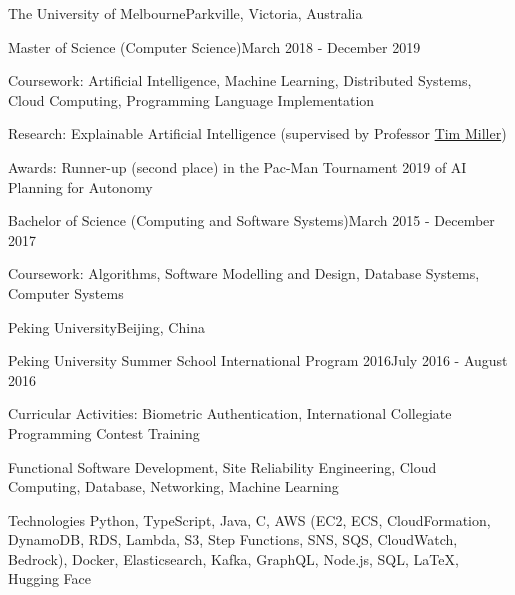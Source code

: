\documentclass{cv}
\begin{document}
\begin{cvlist}

\begin{cvheading}{The University of Melbourne}{Parkville, Victoria, Australia}
\begin{cvsubheading}{Master of Science (Computer Science)}{March 2018 - December 2019}
    \item Coursework: Artificial Intelligence, Machine Learning, Distributed Systems, Cloud Computing, Programming Language Implementation
    \item Research: Explainable Artificial Intelligence (supervised by Professor \href{https://eecs.uq.edu.au/profile/9477/tim-miller}{Tim Miller})
    \item Awards: Runner-up (second place) in the Pac-Man Tournament 2019 of AI Planning for Autonomy
\end{cvsubheading}
\begin{cvsubheading}{Bachelor of Science (Computing and Software Systems)}{March 2015 - December 2017}
    \item Coursework: Algorithms, Software Modelling and Design, Database Systems, Computer Systems
\end{cvsubheading}
\end{cvheading}

\begin{cvheading}{Peking University}{Beijing, China}
\begin{cvsubheading}{Peking University Summer School International Program 2016}{July 2016 - August 2016}
    \item Curricular Activities: Biometric Authentication, International Collegiate Programming Contest Training
\end{cvsubheading}
\end{cvheading}

\end{cvlist}

\begin{cvlist}[-2.0pt]

\begin{cvlistitem}{Functional}
Software Development, Site Reliability Engineering, Cloud Computing, Database, Networking, Machine Learning
\end{cvlistitem}

\begin{cvlistitem}{Technologies}
Python, TypeScript, Java, C, AWS (EC2, ECS, CloudFormation, DynamoDB, RDS, Lambda, S3, Step Functions, SNS, SQS, CloudWatch, Bedrock), Docker, Elasticsearch, Kafka, GraphQL, Node.js, SQL, \LaTeX, Hugging Face
\end{cvlistitem}

\end{cvlist}
\end{document}
